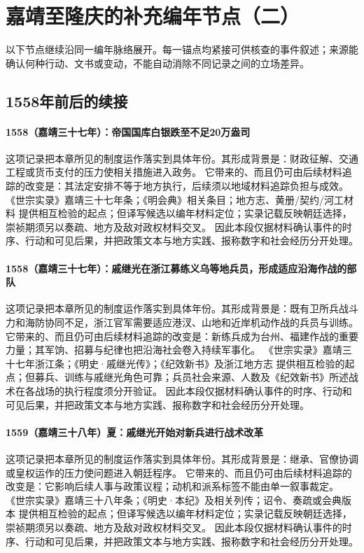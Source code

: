 \section{嘉靖至隆庆的补充编年节点（二）}
以下节点继续沿同一编年脉络展开。每一锚点均紧接可供核查的事件叙述；来源能确认何种行动、文书或变动，不能自动消除不同记录之间的立场差异。

\subsection{1558年前后的续接}

\paragraph{1558（嘉靖三十七年）：帝国国库白银跌至不足20万盎司} 这项记录把本章所见的制度运作落实到具体年份。其形成背景是：财政征解、交通工程或货币支付的压力使相关措施进入政务。 它带来的、而且仍可由后续材料追踪的改变是：其法定安排不等于地方执行，后续须以地域材料追踪负担与成效。 《世宗实录》嘉靖三十七年条；《明会典》相关条目；地方志、黄册/契约/河工材料 提供相互检验的起点；但译写候选以编年材料定位；实录记载反映朝廷选择，崇祯期须另以奏疏、地方及敌对政权材料交叉。 因此本段仅据材料确认事件的时序、行动和可见后果，并把政策文本与地方实践、报称数字和社会经历分开处理。

\paragraph{1558（嘉靖三十七年）：戚继光在浙江募练义乌等地兵员，形成适应沿海作战的部队} 这项记录把本章所见的制度运作落实到具体年份。其形成背景是：既有卫所兵战斗力和海防协同不足，浙江官军需要适应港汊、山地和近岸机动作战的兵员与训练。 它带来的、而且仍可由后续材料追踪的改变是：新练兵成为台州、福建作战的重要力量；其军饷、招募与纪律也把沿海社会卷入持续军事化。 《世宗实录》嘉靖三十七年浙江条；《明史·戚继光传》；《纪效新书》及浙江地方志 提供相互检验的起点；但募兵、训练与戚继光角色可靠；兵员社会来源、人数及《纪效新书》所述战术在各战场的执行程度须分开验证。 因此本段仅据材料确认事件的时序、行动和可见后果，并把政策文本与地方实践、报称数字和社会经历分开处理。

\paragraph{1559（嘉靖三十八年）夏：戚继光开始对新兵进行战术改革} 这项记录把本章所见的制度运作落实到具体年份。其形成背景是：继承、官僚协调或皇权运作的压力使问题进入朝廷程序。 它带来的、而且仍可由后续材料追踪的改变是：它影响后续人事与政策议程；动机和派系标签不能由单一叙事裁定。 《世宗实录》嘉靖三十八年条；《明史·本纪》及相关列传；诏令、奏疏或会典版本 提供相互检验的起点；但译写候选以编年材料定位；实录记载反映朝廷选择，崇祯期须另以奏疏、地方及敌对政权材料交叉。 因此本段仅据材料确认事件的时序、行动和可见后果，并把政策文本与地方实践、报称数字和社会经历分开处理。

